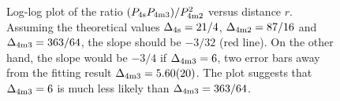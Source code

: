 \documentclass[aps,prl,twocolumn,showpacs,superscriptaddress,groupedaddress]{revtex4}  %
\begin{document}
\begin{figure}
\caption{
    \label{fig:4Nratio}
    Log-log plot of the ratio $(P_{\rm 4s} P_{\rm 4m3})/P_{\rm 4m2}^2$  versus distance $r$. 
    Assuming the theoretical values $\Delta_{\rm 4s}=21/4$, $\Delta_{\rm 4m2}=87/16$ and $\Delta_{\rm 4m3} = 363/64$,
    the slope should be $-3/32$ (red line). On the other hand, the slope would be $-3/4$ if $\Delta_{\rm 4m3} = 6$, 
    two error bars away from the fitting result $\Delta_{\rm 4m3} = 5.60(20)$. 
    The plot suggests that $\Delta_{\rm 4m3} = 6$ is much less likely than $\Delta_{\rm 4m3} = 363/64$.
    }
\end{figure}
\end{document}
